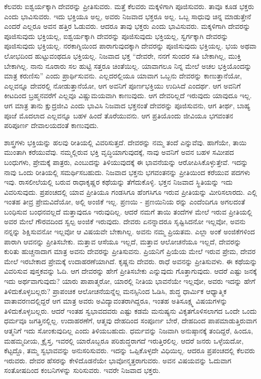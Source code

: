 ಕೆಲವರು ಐಶ್ವರ್ಯಕ್ಕಾಗಿ ದೇವರನ್ನು ಪ್ರೀತಿಸುವರು. ಮತ್ತೆ ಕೆಲವರು ಮಕ್ಕಳಿಗಾಗಿ ಪೂಜಿಸುವರು. ತಾವೂ ಕೂಡ ಭಕ್ತರು ಎಂದು ಭಾವಿಸುವರು. ಇದು ಭಕ್ತಿಯೂ ಅಲ್ಲ, ಅವರು ನಿಜವಾದ ಭಕ್ತರೂ ಅಲ್ಲ. ಒಬ್ಬ ಸಾಧುವು ಚಿನ್ನ ಮಾಡುತ್ತೇನೆ ಎಂದರೆ ಎಲ್ಲರೂ ಅವನ ಹತ್ತಿರ ಓಡುವರು. ಆದರೂ ತಾವು ಭಕ್ತರು ಎಂದು ಭಾವಿಸುವರು. ಮಕ್ಕಳಿಗಾಗಿ ದೇವರನ್ನು ಪೂಜಿಸುವುದು ಭಕ್ತಿಯಲ್ಲ, ಐಶ್ವರ್ಯಕ್ಕಾಗಿ ದೇವರನ್ನು ಪೂಜಿಸುವುದು ಭಕ್ತಿಯಲ್ಲ, ಸ್ವರ್ಗಕ್ಕಾಗಿ ದೇವರನ್ನು ಪೂಜಿಸುವುದು ಭಕ್ತಿಯಲ್ಲ. ನರಕಾಗ್ನಿಯಿಂದ ಪಾರಾಗುವುದಕ್ಕಾಗಿ ದೇವರನ್ನು ಪೂಜಿಸುವುದು ಭಕ್ತಿಯಲ್ಲ. ಭಯ ಅಥವಾ ಲೋಭದಿಂದ ಹುಟ್ಟುವಂಥದೂ ಭಕ್ತಿಯಲ್ಲ. ನಿಜವಾದ ಭಕ್ತ “ದೇವರೇ, ನನಗೆ ಸುಂದರ ಸತಿ ಬೇಕಾಗಿಲ್ಲ, ಮುಕ್ತಿ ಬೇಕಾಗಿಲ್ಲ. ನಾನು ನೂರಾರು ಸಲ ಹುಟ್ಟಿ ಸತ್ತರೂ ಚಿಂತೆಯಿಲ್ಲ. ಯಾವಾಗಲೂ ನಿನ್ನ ಮೇಲೆ ಅಚಲ ಭಕ್ತಿಯೊಂದನ್ನು ಮಾತ್ರ ಕರುಣಿಸು” ಎಂದು ಪ್ರಾರ್ಥಿಸುವನು. ಎಲ್ಲದರಲ್ಲಿಯೂ ಯಾವಾಗ ಒಬ್ಬನು ದೇವರನ್ನು ಕಾಣುತ್ತಾನೆಯೋ, ಎಲ್ಲವನ್ನೂ ದೇವರಲ್ಲಿ ನೋಡುತ್ತಾನೆಯೋ, ಆಗ ಅವನಿಗೆ ಪೂರ್ಣಭಕ್ತಿಯು ಉದಿಸಿದೆ ಎಂದರ್ಥ. ಆಗ ಅವನಿಗೆ ಕೀಟದಿಂದ ಬ್ರಹ್ಮನವರೆಗೆ ಎಲ್ಲವೂ ವಿಷ್ಣುಮಯವಾಗಿ ಕಾಣುವುದು. ಆಗ ದೇವರಿಲ್ಲದೆ ಇರುವುದು ಯಾವುದೂ ಇಲ್ಲ. ಆಗ ಮಾತ್ರ ತಾನು ಕ್ಷುದ್ರಜೀವಿ ಎಂದು ಭಾವಿಸಿ ನಿಜವಾದ ಭಕ್ತನಂತೆ ದೇವರನ್ನು ಪೂಜಿಸುವನು, ಆಗ ತೀರ್ಥ, ಬಾಹ್ಯ ಪೂಜೆ ಮೊದಲಾದ ಎಲ್ಲವನ್ನೂ ಬಹಳ ಹಿಂದೆ ತೊರೆಯುವನು. ಆಗ ಪ್ರತಿಯೊಂದು ಜೀವಿಯೂ ಭಗವಂತನ ಪರಿಪೂರ್ಣ ದೇವಾಲಯದಂತೆ ಕಾಣುವುದು.

ಶಾಸ್ತ್ರಗಳು ಭಕ್ತಿಯನ್ನು ಹಲವು ರೀತಿಯಲ್ಲಿ ವಿವರಿಸುತ್ತದೆ. ದೇವರನ್ನು ನಮ್ಮ ತಂದೆ ಎನ್ನುವೆವು. ಹಾಗೆಯೇ, ತಾಯಿ ಮುಂತಾಗಿ ಕರೆಯುವೆವು. ನಮ್ಮಲ್ಲಿರುವ ಭಕ್ತಿ ವೃದ್ಧಿಯಾಗುವುದಕ್ಕೆ, ನಾವು ಅವನಿಗೆ ಅವನ ಬಹಳ ಸಮೀಪದ ಬಂಧುಗಳು, ಪ್ರೇಮಕ್ಕೆ ಪಾತ್ರರು, ಎಂಬುದನ್ನು ತಿಳಿಯುವುದಕ್ಕೆ ಈ ಭಾವನೆಯನ್ನು ಆರೋಪಿಸಿಕೊಳ್ಳುತ್ತೇವೆ. ಇದನ್ನು ನಾವು ಒಂದು ರೀತಿಯಲ್ಲಿ ಸಮರ್ಥಿಸಬಹುದು. ನಿಜವಾದ ಭಕ್ತನು ಭಗವಂತನನ್ನು ಪ್ರೀತಿಯಿಂದ ಕರೆಯುವ ಪದಗಳು ಇವು. ರಾಸಲೀಲೆಯಲ್ಲಿ ಬರುವ ರಾಧಾಕೃಷ್ಣರ ಕಥೆಯನ್ನು ತೆಗೆದುಕೊಳ್ಳಿ. ಭಕ್ತನ ನಿಜವಾದ ಸ್ಥಿತಿಯನ್ನು ಇದು ವಿವರಿಸುವುದು. ಪ್ರಪಂಚದಲ್ಲಿ ಯಾವ ಪ್ರೀತಿಯೂ ಗಂಡಸಿಗೂ ಹೆಂಗಸಿಗೂ ಇರುವ ಪ್ರೀತಿಯನ್ನು ಮೀರಿಸಲಾರದು. ಎಲ್ಲಿ ಇಂತಹ ತೀವ್ರ ಪ್ರೇಮವಿದೆಯೋ, ಅಲ್ಲಿ ಅಂಜಿಕೆ ಇಲ್ಲ. ಪ್ರಣಯಿ - ಪ್ರಣಯಿನಿಯ ರನ್ನು ಎಂದೆಂದಿಗೂ ಅಗಲದಂತೆ ಬಂಧಿಸುವ ಬಂಧನವಲ್ಲದೆ ಮತ್ತಾವುದೂ ಇರುವುದಿಲ್ಲ. ಆದರೆ ನಮಗೆ ತಾಯಿ ತಂದೆಗಳ ಮೇಲೆ ಇರುವ ಪ್ರೀತಿಯಲ್ಲಿ ಅವರ ಮೇಲೆ ಗೌರವದಿಂದ ಸ್ವಲ್ಪ ಅಂಜಿಕೆ ಇರುವುದು. ದೇವರು ಏನನ್ನಾದರೂ ಸೃಷ್ಟಿಸಿದನೋ ಇಲ್ಲವೋ, ಅವನು ನನ್ನನ್ನು ಶಿಕ್ಷಿಸುವನೋ ಇಲ್ಲವೋ ಆ ವಿಷಯವೇ ಬೇಕಾಗಿಲ್ಲ. ಅವನು ನಮ್ಮ ಪ್ರಿಯತಮ. ಎಲ್ಲಾ ಅಂಕೆ ಅಂಜಿಕೆಗಳಿಂದ ಪಾರಾಗಿ ಆವನನ್ನು ಪ್ರೀತಿಸಬೇಕು. ಮತ್ತಾವ ಆಸೆಯೂ ಇಲ್ಲದೆ, ಮತ್ತಾವ ಆಲೋಚನೆಯೂ ಇಲ್ಲದೆ, ದೇವರನ್ನು ಕುರಿತು ಹುಚ್ಚನಾದಾಗ ಮಾತ್ರ ಅವನು ದೇವರನ್ನು ಪ್ರೀತಿಸುವನು. ಪ್ರಿಯನಿಗೆ ಪ್ರಿಯೆಯ ಮೇಲೆ ಇರುವ ಪ್ರೇಮ, ದೇವರ ಮೇಲೆ ಇರಬೇಕಾದ ಪ್ರೇಮಕ್ಕೆ ಉದಾಹರಣೆಯಾಗಿದೆ. ಕೃಷ್ಣನು ದೇವರು. ರಾಧೆ ಅವನನ್ನು ಪ್ರೀತಿಸುವಳು. ಈ ಕಥೆಯನ್ನು ವಿವರಿಸುವ ಪುಸ್ತಕವನ್ನು ಓದಿ. ಆಗ ದೇವರನ್ನು ಹೇಗೆ ಪ್ರೀತಿಸಬೇಕು ಎನ್ನುವುದು ಗೊತ್ತಾಗುವುದು. ಆದರೆ ಎಷ್ಟು ಜನಕ್ಕೆ ಇದು ಅರ್ಥವಾಗುವುದು? ಯಾರು ಪಾಪಾತ್ಮರೋ, ಯಾರಲ್ಲಿ ನೀತಿಯ ಭಾವನೆಯೇ ಇಲ್ಲವೋ, ಅವರು ಇದನ್ನು ಹೇಗೆ ತಿಳಿದುಕೊಳ್ಳಬಲ್ಲರು? ಪ್ರಾಪಂಚಿಕ ಆಲೋಚನೆಯನ್ನೆಲ್ಲ ಮನಸ್ಸಿನಿಂದ ಓಡಿಸಿ, ಶುದ್ಧ ಧಾರ್ಮಿಕ ಆಧ್ಯಾತ್ಮಿಕ ವಾತಾವರಣದಲ್ಲಿದ್ದರೆ ಆಗ ಮಾತ್ರ ಅವರು ಅವಿದ್ಯಾವಂತರಾಗಿದ್ದರೂ, ಇಂತಹ ಅತಿಸೂಕ್ಷ್ಮ ವಿಷಯಗಳನ್ನು ತಿಳಿದುಕೊಳ್ಳಬಲ್ಲರು. ಆದರೆ ಇಂತಹ ಸ್ವಭಾವದವರು ಎಷ್ಟು ಕಡಮೆ ಮನುಷ್ಯನು ವಿಕೃತಗೊಳಿಸಲಾಗದ ಒಂದೇ ಒಂದು ಧರ್ಮವೂ ಜಗತ್ತಿನಲ್ಲಿಲ್ಲ. ಉದಾಹರಣೆಗೆ, ಆತ್ಮವು ದೇಹದಿಂದ ಸಂಪೂರ್ಣ ಬೇರೆ, ದೇಹದಿಂದ ಪಾಪಮಾಡುತ್ತಿರುವಾಗ ಆತ್ಮನಿಗೆ ಇದು ಸೋಂಕುವುದಿಲ್ಲ ಎಂದು ತಿಳಿಯಬಹುದು. ಧರ್ಮವನ್ನು ನಿಜವಾಗಿ ಅನುಷ್ಠಾನಕ್ಕೆ ತಂದಿದ್ದರೆ, ಹಿಂದೂ, ಮಹಮ್ಮದೀಯ, ಕ್ರೈಸ್ತ, ಇವರಲ್ಲಿ ಯಾರೊಬ್ಬರೂ ಪರಿಶುದ್ಧರಾಗದೆ ಇರುತ್ತಿರಲಿಲ್ಲ. ಆದರೆ ಜನರು ಒಳ್ಳೆಯದೋ, ಕೆಟ್ಟದ್ದೊ, ತಮ್ಮ ಸ್ವಭಾವವನ್ನು ಅನುಸರಿಸುವರು. ಇದನ್ನು ಒಪ್ಪಿಕೊಳ್ಳದೇ ವಿಧಿಯಿಲ್ಲ. ಆದರೂ ಪ್ರಪಂಚದಲ್ಲಿ ಕೆಲವರು ಇರುವರು. ದೇವರ ಹೆಸರನ್ನು ಕೇಳಿದೊಡನೆಯೇ ಭಾವೋನ್ಮತ್ತರಾಗುವರು. ಅವನ ವಿಷಯವನ್ನು ಓದುವಾಗ ಸಂತೋಷದಿಂದ ಕಂಬನಿಗಳನ್ನು ಸುರಿಸುವರು. ಇವರೇ ನಿಜವಾದ ಭಕ್ತರು.

